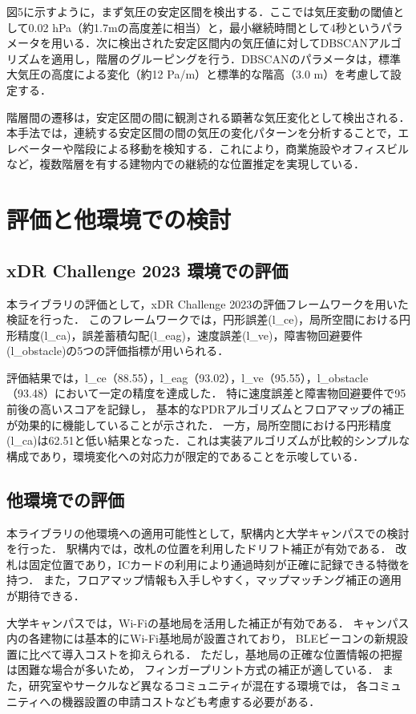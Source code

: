 \documentclass[a4paper, 10pt, twocolumn]{jarticle}
\begin{document}
図5に示すように，まず気圧の安定区間を検出する．ここでは気圧変動の閾値として0.02 hPa（約1.7mの高度差に相当）と，最小継続時間として4秒というパラメータを用いる．次に検出された安定区間内の気圧値に対してDBSCANアルゴリズムを適用し，階層のグルーピングを行う．DBSCANのパラメータは，標準大気圧の高度による変化（約12 Pa/m）と標準的な階高（3.0 m）を考慮して設定する．

階層間の遷移は，安定区間の間に観測される顕著な気圧変化として検出される．本手法では，連続する安定区間の間の気圧の変化パターンを分析することで，エレベーターや階段による移動を検知する．これにより，商業施設やオフィスビルなど，複数階層を有する建物内での継続的な位置推定を実現している．


\section{評価と他環境での検討}


\subsection{xDR Challenge 2023 環境での評価}

本ライブラリの評価として，xDR Challenge 2023の評価フレームワークを用いた検証を行った．
このフレームワークでは，円形誤差(l\_ce)，局所空間における円形精度(l\_ca)，誤差蓄積勾配(l\_eag)，速度誤差(l\_ve)，障害物回避要件(l\_obstacle)の5つの評価指標が用いられる．

評価結果では，l\_ce（88.55），l\_eag（93.02），l\_ve（95.55），l\_obstacle（93.48）において一定の精度を達成した．
特に速度誤差と障害物回避要件で95前後の高いスコアを記録し，
基本的なPDRアルゴリズムとフロアマップの補正が効果的に機能していることが示された．
一方，局所空間における円形精度(l\_ca)は62.51と低い結果となった．これは実装アルゴリズムが比較的シンプルな構成であり，環境変化への対応力が限定的であることを示唆している．


\subsection{他環境での評価}

本ライブラリの他環境への適用可能性として，駅構内と大学キャンパスでの検討を行った．
駅構内では，改札の位置を利用したドリフト補正が有効である．
改札は固定位置であり，ICカードの利用により通過時刻が正確に記録できる特徴を持つ．
また，フロアマップ情報も入手しやすく，マップマッチング補正の適用が期待できる．

大学キャンパスでは，Wi-Fiの基地局を活用した補正が有効である．
キャンパス内の各建物には基本的にWi-Fi基地局が設置されており，
BLEビーコンの新規設置に比べて導入コストを抑えられる．
ただし，基地局の正確な位置情報の把握は困難な場合が多いため，
フィンガープリント方式の補正が適している．
また，研究室やサークルなど異なるコミュニティが混在する環境では，
各コミュニティへの機器設置の申請コストなども考慮する必要がある．
\end{document}
